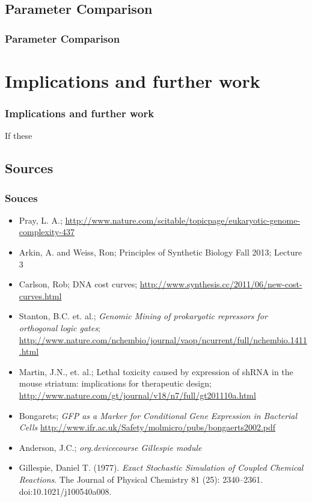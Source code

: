 \documentclass{beamer}
\begin{document}

\subsection{Parameter Comparison}
\begin{frame}
\frametitle{Parameter Comparison}


\end{frame}


\section{Implications and further work}
\begin{frame}
\frametitle{Implications and further work}
If these 
\end{frame}


\subsection{Sources}
\begin{frame}
\frametitle{Souces}

\begin{itemize}
\item Pray, L. A.; \url{http://www.nature.com/scitable/topicpage/eukaryotic-genome-complexity-437}
\item Arkin, A. and Weiss, Ron; Principles of Synthetic Biology Fall 2013; Lecture 3
\item Carlson, Rob; DNA cost curves; \url{http://www.synthesis.cc/2011/06/new-cost-curves.html}
\item Stanton, B.C. et. al.; \emph{Genomic Mining of prokaryotic repressors for orthogonal logic gates};
  \url{http://www.nature.com/nchembio/journal/vaop/ncurrent/full/nchembio.1411.html}
\item Martin, J.N., et. al.; Lethal toxicity caused by expression of shRNA in the mouse striatum: implications for therapeutic design;
  \url{http://www.nature.com/gt/journal/v18/n7/full/gt201110a.html}
\item Bongarets; \emph{GFP as a Marker for Conditional Gene Expression in Bacterial Cells}
  \url{http://www.ifr.ac.uk/Safety/molmicro/pubs/bongaerts2002.pdf}
\item Anderson, J.C.; \emph{org.devicecourse Gillespie module}
\item Gillespie, Daniel T. (1977). \emph{Exact Stochastic Simulation of Coupled Chemical Reactions}. The Journal of Physical Chemistry 81 (25): 2340–2361. doi:10.1021/j100540a008.
\end{itemize}

\end{frame}
\end{document}
